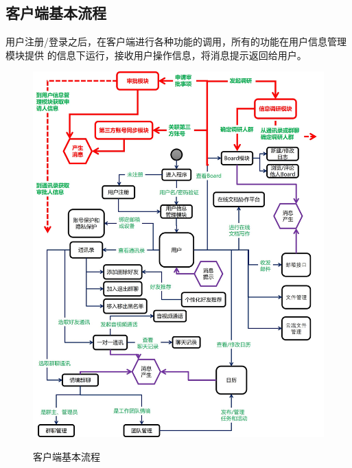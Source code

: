     \subsection{\color{red}客户端基本流程}
        用户注册/登录之后，在客户端进行各种功能的调用，所有的功能在用户信息管理模块提供
        的信息下运行，接收用户操作信息，将消息提示返回给用户。
        \begin{figure}[ht]
            \centering
            \includegraphics[scale = 0.38]{OutlineDesign/figures/客户端基本流程2.jpg}
            \label{tab:classification}
            \caption{\color{red}客户端基本流程}
            \label{fig:noted-figure}
        \end{figure}
        \newpage
